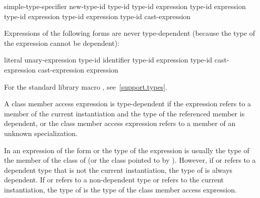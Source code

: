 \begin{ncsimplebnf}
simple-type-specifier \terminal{(}  \terminal{)}\br
\opt{\terminal{::}}   new-type-id \br
\opt{\terminal{::}}   \terminal{(} type-id \terminal{)} \br
{} \terminal{<} type-id \terminal{>} \terminal{(} expression \terminal{)}\br
{} \terminal{<} type-id \terminal{>} \terminal{(} expression \terminal{)}\br
{} \terminal{<} type-id \terminal{>} \terminal{(} expression \terminal{)}\br
{} \terminal{<} type-id \terminal{>} \terminal{(} expression \terminal{)}\br
\terminal{(} type-id \terminal{)} cast-expression
\end{ncsimplebnf}

\pnum
Expressions of the following forms are never type-dependent (because the type
of the expression cannot be dependent):

\begin{ncsimplebnf}
literal\br
{} unary-expression\br
{} \terminal{(} type-id \terminal{)}\br
{}  \terminal{(} identifier \terminal{)}\br
{} \terminal{(} type-id \terminal{)}\br
{} \terminal{(} expression \terminal{)}\br
{} \terminal{(} type-id \terminal{)}\br
\opt{\terminal{::}}  cast-expression\br
\opt{\terminal{::}}  \terminal{[} \terminal{]} cast-expression\br
{} \br
{} \terminal{(} expression \terminal{)}
\end{ncsimplebnf}

\begin{note} For the standard library macro ,
see~\ref{support.types}.\end{note}

\pnum
A class member access expression is
type-dependent if
the expression refers to a member of the current instantiation and
the type of the referenced member is dependent, or the class member access
expression refers to a member of an unknown specialization.
\begin{note}
In an expression of the form
or
the type of the expression is usually the type of the member
of the class of
(or the class pointed to by
).
However, if
or
refers to a dependent type that is not the current instantiation,
the type of
is always dependent. If
or 
refers to a non-dependent type or refers to the current instantiation, the
type of
is the type of the class member access expression.
\end{note}

